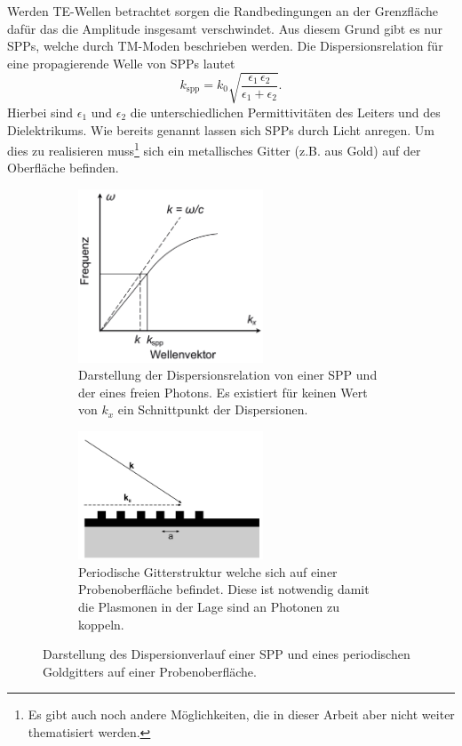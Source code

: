 Werden TE-Wellen betrachtet sorgen die Randbedingungen an der Grenzfläche
dafür das die Amplitude insgesamt verschwindet.\cite{plasmonics} 
Aus diesem Grund gibt es nur SPPs, welche durch TM-Moden beschrieben werden. 
Die Dispersionsrelation für eine propagierende Welle von SPPs lautet
\begin{equation}
    k_\text{spp} = k_0 \sqrt{\frac{\epsilon_1 \,\epsilon_2}{\epsilon_1 + \epsilon_2}}.
    \label{eq:disp}
\end{equation}
Hierbei sind $\epsilon_1$ und $\epsilon_2$ die unterschiedlichen Permittivitäten des Leiters und
des Dielektrikums.
Wie bereits genannt lassen sich SPPs durch Licht anregen.
Um dies zu realisieren muss\footnote{Es gibt auch noch andere Möglichkeiten,
die in dieser Arbeit aber nicht weiter thematisiert werden.} sich ein metallisches Gitter 
(z.B. aus Gold) auf der Oberfläche befinden.

\begin{figure}
    \centering
    \begin{subfigure}{0.5\textwidth}
        \centering
        \includegraphics[width=5.5cm]{./Plots/disp.png}
        \caption{Darstellung der Dispersionsrelation von einer SPP und der eines freien Photons.
        Es existiert für keinen Wert von $k_x$ ein Schnittpunkt der Dispersionen. \cite{disp}}
        \label{fig:disp}
    \end{subfigure}
    \begin{subfigure}{0.5\textwidth}
        \centering
        \includegraphics[width=5.5cm]{./Plots/gitter.png}
        \caption{Periodische Gitterstruktur welche sich auf einer Probenoberfläche befindet. 
        Diese ist notwendig damit die Plasmonen in der Lage sind an Photonen zu koppeln.\cite{disp} }
        \label{fig:gitter}
    \end{subfigure}
    \caption{Darstellung des Dispersionverlauf einer SPP und eines periodischen Goldgitters auf einer Probenoberfläche.}
    \label{fig:disp_und_gitter}
\end{figure}
\FloatBarrier

